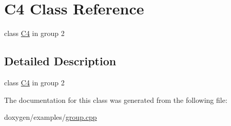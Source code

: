 \hypertarget{class_c4}{}\section{C4 Class Reference}
\label{class_c4}


class \mbox{\hyperlink{class_c4}{C4}} in group 2  




\subsection{Detailed Description}
class \mbox{\hyperlink{class_c4}{C4}} in group 2 

The documentation for this class was generated from the following file\+:\begin{DoxyCompactItemize}
\item 
doxygen/examples/\mbox{\hyperlink{group_8cpp}{group.\+cpp}}\end{DoxyCompactItemize}
